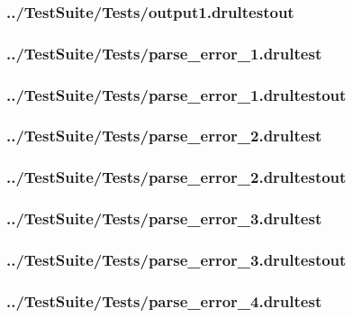\begin{changemargin}{-1in}{-1in}
\subsubsection{../TestSuite/Tests/output1.drultestout}


\subsubsection{../TestSuite/Tests/parse\_error\_1.drultest}


\subsubsection{../TestSuite/Tests/parse\_error\_1.drultestout}


\subsubsection{../TestSuite/Tests/parse\_error\_2.drultest}


\subsubsection{../TestSuite/Tests/parse\_error\_2.drultestout}


\subsubsection{../TestSuite/Tests/parse\_error\_3.drultest}


\subsubsection{../TestSuite/Tests/parse\_error\_3.drultestout}


\subsubsection{../TestSuite/Tests/parse\_error\_4.drultest}



\end{changemargin}

